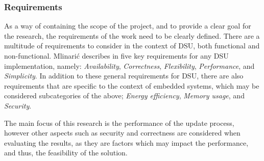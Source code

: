 \subsubsection*{Requirements}
As a way of containing the scope of the project, and to provide a clear goal for the research, the requirements of the work need to be clearly defined. There are a multitude of requirements to consider in the context of DSU, both functional and non-functional. Mlinarić describes in \cite{dsuChallenges} five key requirements for any DSU implementation, namely: \textit{Availability}, \textit{Correctness}, \textit{Flexibility}, \textit{Performance}, and \textit{Simplicity}. In addition to these general requirements for DSU, there are also requirements that are specific to the context of embedded systems, which may be considered subcategories of the above; \textit{Energy efficiency}, \textit{Memory usage}, and \textit{Security}.

The main focus of this research is the performance of the update process, however other aspects such as security and correctness are considered when evaluating the results, as they are factors which may impact the performance, and thus, the feasibility of the solution.